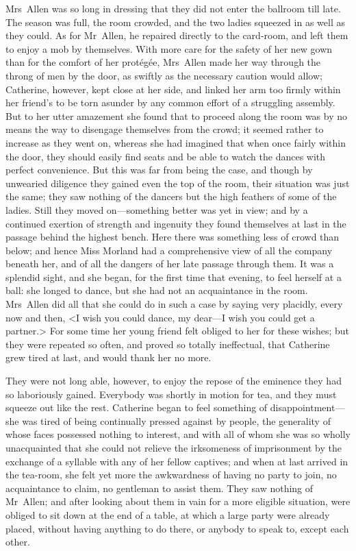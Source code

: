  Mrs~Allen was so long in dressing that they did not enter the ballroom till late. The season was full, the room crowded, and the two ladies squeezed in as well as they could. As for Mr~Allen, he repaired directly to the card-room, and left them to enjoy a mob by themselves. With more care for the safety of her new gown than for the comfort of her protégée, Mrs~Allen made her way through the throng of men by the door, as swiftly as the necessary caution would allow; Catherine, however, kept close at her side, and linked her arm too firmly within her friend's to be torn asunder by any common effort of a struggling assembly. But to her utter amazement she found that to proceed along the room was by no means the way to disengage themselves from the crowd; it seemed rather to increase as they went on, whereas she had imagined that when once fairly within the door, they should easily find seats and be able to watch the dances with perfect convenience. But this was far from being the case, and though by unwearied diligence they gained even the top of the room, their situation was just the same; they saw nothing of the dancers but the high feathers of some of the ladies. Still they moved on—something better was yet in view; and by a continued exertion of strength and ingenuity they found themselves at last in the passage behind the highest bench. Here there was something less of crowd than below; and hence Miss Morland had a comprehensive view of all the company beneath her, and of all the dangers of her late passage through them. It was a splendid sight, and she began, for the first time that evening, to feel herself at a ball: she longed to dance, but she had not an acquaintance in the room. Mrs~Allen did all that she could do in such a case by saying very placidly, every now and then, <I wish you could dance, my dear—I wish you could get a partner.> For some time her young friend felt obliged to her for these wishes; but they were repeated so often, and proved so totally ineffectual, that Catherine grew tired at last, and would thank her no more. 

 They were not long able, however, to enjoy the repose of the eminence they had so laboriously gained. Everybody was shortly in motion for tea, and they must squeeze out like the rest. Catherine began to feel something of disappointment—she was tired of being continually pressed against by people, the generality of whose faces possessed nothing to interest, and with all of whom she was so wholly unacquainted that she could not relieve the irksomeness of imprisonment by the exchange of a syllable with any of her fellow captives; and when at last arrived in the tea-room, she felt yet more the awkwardness of having no party to join, no acquaintance to claim, no gentleman to assist them. They saw nothing of Mr~Allen; and after looking about them in vain for a more eligible situation, were obliged to sit down at the end of a table, at which a large party were already placed, without having anything to do there, or anybody to speak to, except each other. 

